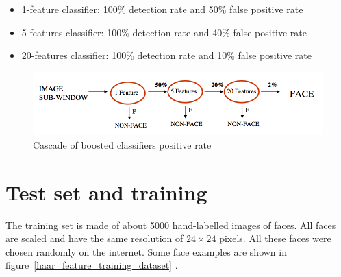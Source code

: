 \begin{itemize}
  \item 1-feature classifier: 100\% detection rate and 50\% false positive rate
  \item 5-features classifier: 100\% detection rate and 40\% false positive rate 
  \item 20-features classifier: 100\% detection rate and 10\% false positive rate
\end{itemize}

\begin{figure}[!h]
\begin{center}
\noindent \includegraphics[scale=0.5]{figures/haar_feature_cascade_rate} 
\newline
\caption{Cascade of boosted classifiers positive rate}
\label{haar_feature_cascade_rate}
\end{center} 
\end{figure}

\section{Test set and training}

\vspace{\baselineskip}
\noindent The training set is made of about 5000 hand-labelled images of faces. All faces are scaled and have the same resolution of $ 24\times24 $ pixels. All these faces were chosen randomly on the internet. Some face examples are shown in figure~\ref{haar_feature_training_dataset} \cite{VIO01}.
\newline

